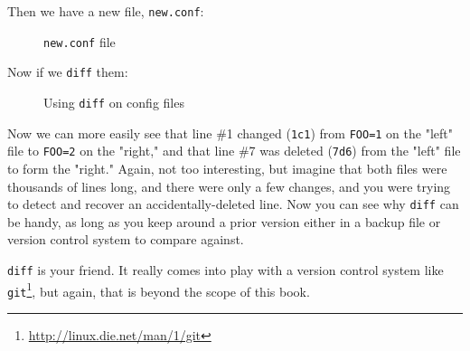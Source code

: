 \documentclass[10pt,american,]{book}
\makeatletter
\newenvironment{Shaded}{\begin{snugshade}}{\end{snugshade}}
\newcommand{\KeywordTok}[1]{\textcolor[rgb]{0.13,0.29,0.53}{\textbf{{#1}}}}
\newcommand{\OtherTok}[1]{\textcolor[rgb]{0.56,0.35,0.01}{{#1}}}
\newcommand{\NormalTok}[1]{{#1}}
\renewcommand{\href}[2]{#2\footnote{\url{#1}}}
\numberwithin{figure}{chapter}
\DeclareRobustCommand{\drcap}[1]{\begin{figure}[H]\caption{#1}\end{figure}}
\DeclareRobustCommand{\drcmd}[1]{
    \index{commands!#1@\texttt{#1}}
}
\renewcommand{\KeywordTok}[1]{{#1}}
\renewcommand{\OtherTok}[1]{{#1}}
\renewcommand{\NormalTok}[1]{{#1}}
\makeatother
\begin{document}
\begin{Shaded}
\end{Shaded}

Then we have a new file, \texttt{new.conf}:

\drcap{\texttt{new.conf} file}

\begin{Shaded}
\end{Shaded}

Now if we \texttt{diff} them:

\drcap{Using \texttt{diff} on config files}

\begin{Shaded}
\end{Shaded}

Now we can more easily see that line \#1 changed (\texttt{1c1}) from
\texttt{FOO=1} on the "left" file to \texttt{FOO=2} on the "right," and
that line \#7 was deleted (\texttt{7d6}) from the "left" file to form
the "right." Again, not too interesting, but imagine that both files
were thousands of lines long, and there were only a few changes, and you
were trying to detect and recover an accidentally-deleted line. Now you
can see why \texttt{diff} can be handy, as long as you keep around a
prior version either in a backup file or version control system to
compare against.

\texttt{diff} is your friend. It really comes into play with a version
control system like \href{http://linux.die.net/man/1/git}{\texttt{git}},
but again, that is beyond the scope of this book. \drcmd{git}
\end{document}

